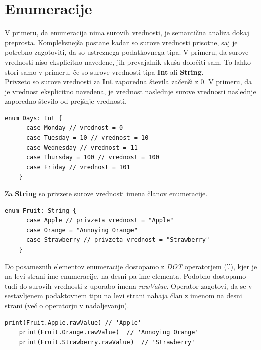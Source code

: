 \documentclass[a4paper, 12p]{book}
\begin{document}
\section{Enumeracije}

V primeru, da enumeracija nima surovih vrednosti, je semantična analiza dokaj preprosta. Kompleksnejša postane kadar so surove vrednosti prisotne, saj je potrebno zagotoviti, da so ustreznega podatkovnega tipa. V primeru, da surove vrednosti niso eksplicitno navedene, jih prevajalnik skuša določiti sam. To lahko stori samo v primeru, če so surove vrednosti tipa \textbf{Int} ali \textbf{String}. \\
\indent Privzeto so surove vrednosti za \textbf{Int} zaporedna števila začenši z 0. V primeru, da je vrednost eksplicitno navedena, je vrednost naslednje surove vrednosti naslednje zaporedno število od prejšnje vrednosti.

\begin{lstlisting}[caption={Enumeracija s surovimi vrednostmi tipa Int.}, captionpos=b]
	enum Days: Int {
	  case Monday // vrednost = 0
	  case Tuesday = 10 // vrednost = 10
	  case Wednesday // vrednost = 11
	  case Thursday = 100 // vrednost = 100
	  case Friday // vrednost = 101
	}
\end{lstlisting}

\indent Za \textbf{String} so privzete surove vrednosti imena članov enumeracije.

\begin{lstlisting}[caption={Enumeracija s surovimi vrednostmi tipa String.}, captionpos=b, label={lst:fruitEnumeration}]
	enum Fruit: String {
	  case Apple // privzeta vrednost = "Apple"
	  case Orange = "Annoying Orange"
	  case Strawberry // privzeta vrednost = "Strawberry"
	}
\end{lstlisting}

Do posameznih elementov enumeracije dostopamo z \textit{DOT} operatorjem ('.'), kjer je na levi strani ime enumeracije, na desni pa ime elementa. Podobno dostopamo tudi do surovih vrednosti z uporabo imena \textit{rawValue}. Operator zagotovi, da se v sestavljenem podaktovnem tipu na levi strani nahaja član z imenom na desni strani (več o operatorju v nadaljevanju).

\begin{lstlisting}[caption={Primer dostopa do elementov enumeracije ~\ref{lst:fruitEnumeration}.}, captionpos=b]
	print(Fruit.Apple.rawValue) // 'Apple'
	print(Fruit.Orange.rawValue)  // 'Annoying Orange'
	print(Fruit.Strawberry.rawValue)  // 'Strawberry'
\end{lstlisting}
\end{document}
